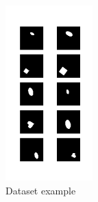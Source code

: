 \documentclass{article}
\begin{document}
    \begin{figure}[t]
        \centering
        \includegraphics[width=0.3\textwidth]{img/dataset1}
        \caption{Dataset example}
        \label{fig:dataset_1_example}
    \end{figure}
\end{document}
